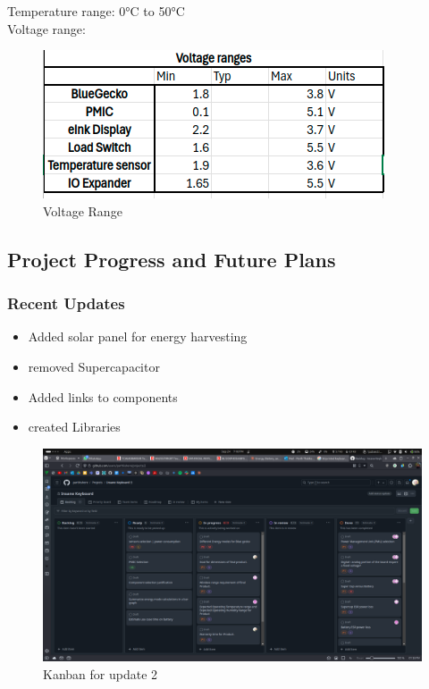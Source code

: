 \documentclass[a4paper,11pt]{article}%
\begin{document}
Temperature range: 0°C to 50°C\\
Voltage range: 
\begin{figure}[H]
	\centering
	\includegraphics[scale=0.6]{figures/vr}
	\caption{Voltage Range}
\end{figure}














\subsection{Project Progress and Future Plans}
\subsubsection{Recent Updates}
\begin{itemize}
    \item Added solar panel for energy harvesting
    \item removed Supercapacitor
    \item Added links to components
    \item created Libraries
\end{itemize}
\begin{figure}[H]
	\centering
	\includegraphics[scale=0.22]{figures/kanban_2.png}
	\caption{Kanban for update 2}
\end{figure}
\end{document}
